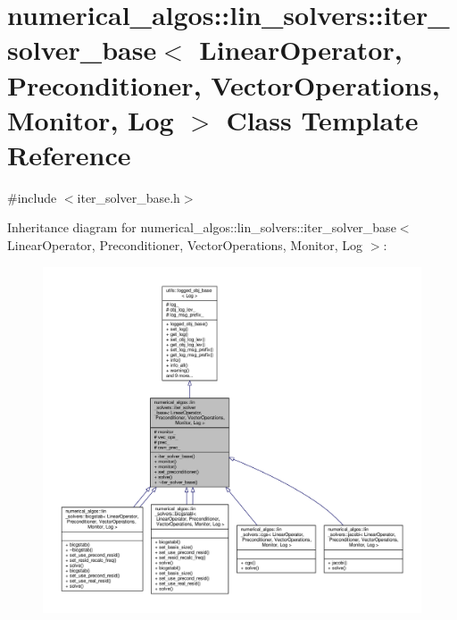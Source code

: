 \hypertarget{classnumerical__algos_1_1lin__solvers_1_1iter__solver__base}{\section{numerical\-\_\-algos\-:\-:lin\-\_\-solvers\-:\-:iter\-\_\-solver\-\_\-base$<$ Linear\-Operator, Preconditioner, Vector\-Operations, Monitor, Log $>$ Class Template Reference}
\label{classnumerical__algos_1_1lin__solvers_1_1iter__solver__base}
}


{\ttfamily \#include $<$iter\-\_\-solver\-\_\-base.\-h$>$}



Inheritance diagram for numerical\-\_\-algos\-:\-:lin\-\_\-solvers\-:\-:iter\-\_\-solver\-\_\-base$<$ Linear\-Operator, Preconditioner, Vector\-Operations, Monitor, Log $>$\-:\nopagebreak
\begin{figure}[H]
\begin{center}
\leavevmode
\includegraphics[width=350pt]{classnumerical__algos_1_1lin__solvers_1_1iter__solver__base__inherit__graph}
\end{center}
\end{figure}


